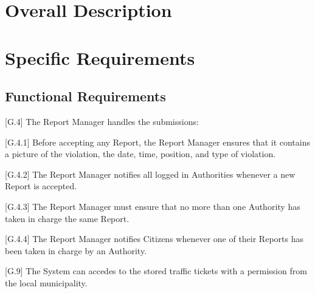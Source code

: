 \documentclass{report}
\begin{document}
\chapter{Overall Description}
\chapter{Specific Requirements}
\section{Functional Requirements}
\begin{itemize}
\item {[G.4]} The Report Manager handles the submissions:
    {\setlength\itemindent{25pt} \item {[G.4.1]} Before accepting any Report, the Report Manager ensures that it contains a picture of the violation, the date, time, position, and type of violation.}
    {\setlength\itemindent{25pt} \item {[G.4.2]} The Report Manager notifies all logged in Authorities whenever a new Report is accepted.}
    {\setlength\itemindent{25pt} \item {[G.4.3]} The Report Manager must ensure that no more than one Authority has taken in charge the same Report.}
    {\setlength\itemindent{25pt} \item {[G.4.4]} The Report Manager notifies Citizens whenever one of their Reports has been taken in charge by an Authority.}
\item {[G.9]} The System can accedes to the stored traffic tickets with a permission from the local municipality.
\end{itemize}
\end{document}
